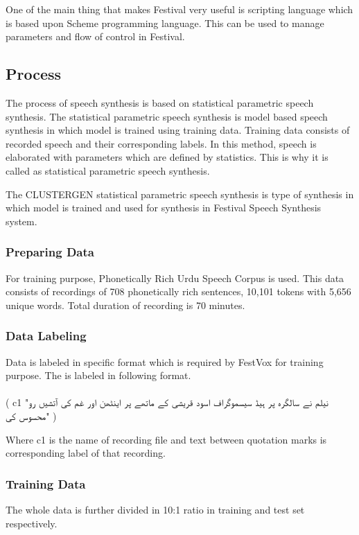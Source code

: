 \begin{itemize}
One of the main thing that makes Festival very useful is scripting language which is based upon Scheme programming language. This can be used to manage parameters and flow of  control in Festival. 

\subsection{Process}

The process of speech synthesis is based on statistical parametric speech synthesis. The statistical parametric speech synthesis is model 
based speech synthesis in which model is trained using training data. Training data consists of recorded speech and their corresponding labels. 
In this method, speech is elaborated with parameters which are defined by statistics. This is why it is called as statistical parametric speech synthesis. 

The CLUSTERGEN statistical parametric speech synthesis is type of synthesis in which model is trained and used for synthesis in 
Festival Speech Synthesis system. 

\subsubsection{Preparing Data}

For training purpose, Phonetically Rich Urdu Speech Corpus \cite{urdu_corpus} is used. This data consists of recordings of 708 phonetically rich sentences, 
10,101 tokens with 5,656 unique words. Total duration of recording is 70 minutes.

\subsubsection{Data Labeling}
Data is labeled in specific format which is required by FestVox for training purpose. The is labeled in following format.
\\ \\
( c1 "\texturdu{نیلم نے سالگرہ پر ہیڈ سیسموگراف اسود قریشی کے ماتھے پر اینٹھن اور غم کی آتشیں رو محسوس کی}" )

Where c1 is the name of recording file and text between quotation marks is corresponding label of that recording.

\subsubsection{Training Data}

The whole data is further divided in 10:1 ratio in training and test set respectively.



\end{itemize}
